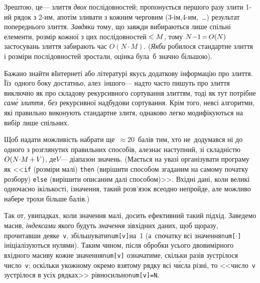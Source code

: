 \documentclass[14pt,a4paper]{extarticle}
\def\dib#1{\,#1\discretionary{}{\mbox{$#1$}}{}\,}
\begin{document}
Зрештою, це\nolinebreak[3] --- злиття \emph{двох} послідовностей; пропонується першого разу злити \mbox{1-ий} рядок з \mbox{2-им}, а\nolinebreak[3] потім зливати з кожним черговим (\mbox{3-ім},\nolinebreak[2] \mbox{4-им},~\dots) результат попереднього злиття. \emph{Завдяки} тому, що завжди вибираються лише спільні елементи, розмір кожної з цих послідовностей${}\leqslant M$, тому ${N{-}1}\dib{{=}}O(N)$ застосувань злиття забирають час $O(N{\cdot}M)$. (\emph{Якби} робилося стандартне злиття і розміри послідовностей зростали, оцінка була~б значно більшою).

Бажано знайти в\nolinebreak[3] Інтернеті або літературі якусь додаткову інформацію про злиття. Її\nolinebreak[2] з~одного боку достатньо, але\nolinebreak[2] з~іншого\nolinebreak[3] --- надто часто пишуть про злиття виключно як про складову рекурсивного сортування злиттям, тоді як тут потрібне \emph{сам\'{е} злиття, без} рекурсивної надбудови сортування. Крім того, не\nolinebreak[3] всі алгоритми, які правильно виконують стандартне злитя, однаково легко модифікуються на вибір лише спільних.

Щоб надати можливість набрати ще~${\approx}20$~балів тим, хто не~додумався ні до одного з розглянутих правильних способів, але\nolinebreak[3] знає наступний, зі складністю $O(N{\cdot}M\dib{{+}}V)$, де\nolinebreak[3] $V$\nolinebreak[3] --- діапазон значень. (Мається на увазі організувати програму як <<\texttt{if} (розміри малі) \texttt{then} (вирішити способом згаданим на самому початку розбору) \texttt{else} (вирішити описаним далі способом)>>. Вхідні дані, коли великі одночасно і\nolinebreak[3] кількості, і\nolinebreak[3] значення, такий розв'язок все\nolinebreak[3] одно не\nolinebreak[3] пройде, але можливо набере трохи більше балів.)

Так от, у\nolinebreak[3] випадках, коли значення малі, досить ефективний такий підхід. Заведемо масив, \emph{індексами} якого будуть \emph{значення} зі\nolinebreak[3] вхідних даних, щоб щоразу, прочитавши деяке~\texttt{v}, збільшувати\nolinebreak[2] \texttt{num[v]}\nolinebreak[2] на~1 (а~спочатку всі значення\nolinebreak[3] \texttt{num[$\cdot$]} ініціалізуються нулями). Таким чином, після обробки усього двовимірного вхідного масиву кожне значення\nolinebreak[2] \texttt{num[v]} означатиме, скільки разів зустрілося число~\texttt{v}; оскільки у\nolinebreak[3] кожному окремо взятому рядку всі ч\'{и}сла різні, то <<число~\texttt{v} зустрілося в усіх рядках>> рівносильно\nolinebreak[1] \mbox{\texttt{num[v]=N}}.
\end{document}
